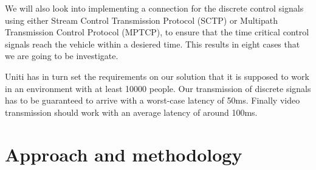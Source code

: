 \documentclass[a4paper]{article}
\begin{document}
We will also look into implementing a connection for the discrete control
signals using either Stream Control Transmission Protocol (SCTP) or Multipath
Transmission Control Protocol (MPTCP), to ensure that the time critical control
signals reach the vehicle within a desiered time. This results in eight cases
that we are going to be investigate.

Uniti has in turn set the requirements on our solution that it is supposed to
work in an environment with at least 10000 people. Our transmission of discrete
signals has to be guaranteed to arrive with a worst-case latency of 50ms.
Finally video transmission should work with an average latency of around 100ms.
 








\section{Approach and methodology}
\end{document}
